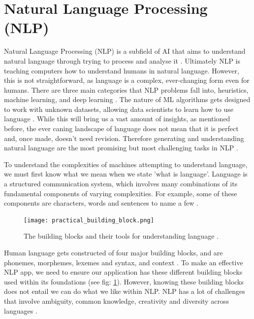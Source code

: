 	
	\section{Natural Language Processing (NLP)}
	Natural Language Processing (NLP) is a subfield of AI that aims to understand natural language through trying to process and analyse it \cite{vasiliev2020natural, vajjala2020practical}. Ultimately NLP is teaching computers how to understand humans in natural language. However, this is not straightforward, as language is a complex, ever-changing form even for humans. There are three main categories that NLP problems fall into, heuristics, machine learning, and deep learning \cite{vajjala2020practical}. The nature of ML algorithms gets designed to work with unknown datasets, allowing data scientists to learn how to use language \cite{vasiliev2020natural}. While this will bring us a vast amount of insights, as mentioned before, the ever caning landscape of language does not mean that it is perfect and, once made, doesn't need revision. Therefore generating and understanding natural language are the most promising but most challenging tasks in NLP \cite{vasiliev2020natural, vajjala2020practical}.
	
	To understand the complexities of machines attempting to understand language, we must first know what we mean when we state 'what is language'. Language is a structured communication system, which involves many combinations of its fundamental components of varying complexities. For example, some of these components are characters, words and sentences to name a few \cite{vajjala2020practical}.
	
	\begin{figure}[t]
		\centering
		\texttt{[image: practical\_building\_block.png]}
		\caption{The building blocks and their tools for understanding language \cite{vajjala2020practical}.}
		\label{fig:practical_building_block}
		
	\end{figure} 
	
	Human language gets constructed of four major building blocks, and are phonemes, morphemes, lexemes and syntax, and context \cite{vajjala2020practical}. To make an effective NLP app, we need to ensure our application has these different building blocks used within its foundations (see fig: \ref{fig:practical_building_block}). However, knowing these building blocks does not entail we can do what we like within NLP. NLP has a lot of challenges that involve ambiguity, common knowledge, creativity and diversity across languages \cite{vajjala2020practical}. 
	
